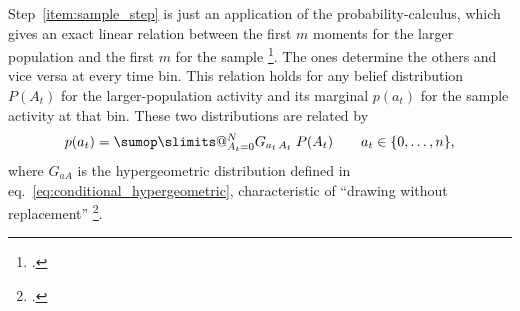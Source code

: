 \documentclass[\ifafour a4paper,12pt,\else a5paper,10pt,\fi%
onecolumn,oneside,article,%
british%
]{memoir}
\makeatletter
\theoremstyle{remark}
\theoremstyle{innote}
\def\sum{\DOTSI\sumop\slimits@}
\newcommand*{\citep}{\footcites}
\DeclarePairedDelimiter\set{\{}{\}}
\renewcommand*{\|}{\nonscript\,\vert\nonscript\;\mathopen{}}
\newcommand*{\sect}{\S}%
\newcommand*{\chap}{ch.}%
\newcommand*{\eqn}{eq.}%
\newcommand*{\yG}{G}
\newcommand*{\yAv}{A}
\newcommand*{\yav}{a}
\newcommand*{\ya}{\yav}%
\newcommand*{\yA}{\yAv}%
\newcommand*{\pxx}{p}
\newcommand*{\pxxx}{P}
\makeatother
\begin{document}
Step~\ref{item:sample_step} is just an application of the
probability-calculus, which gives an exact linear relation between the
first $m$ moments for the larger population and the first $m$ for the
sample \citep[see][for a complete discussion and proofs. Some proofs are
summarized again here in
appendix~\ref{sec:derivation_maxent_fullnet}]{portamanaetal2015}. The ones
determine the others and vice versa at every time bin. This relation holds
for any belief distribution $\pxxx(\yA_{t})$ for the larger-population
activity and its marginal $\pxx(\ya_{t})$ for the sample activity at that
bin. These two distributions are related by
\begin{equation}
  \label{eq:conditional_hypergeometric_t}
  \pxx(\ya_{t})= \sum_{\yA_{t}=0}^{N} \yG_{\ya_{t}\,\yA_{t}} \;\pxxx(\yA_{t})
  \qquad \ya_{t} \in \set{0,\dotsc,n},
\end{equation}
where $\yG_{\ya\yA}$ is the hypergeometric distribution defined in
\eqn~\eqref{eq:conditional_hypergeometric}, characteristic of
\enquote{drawing without replacement}
\citep[\chap~3]{jaynes1994_r2003}.%
\end{document}
